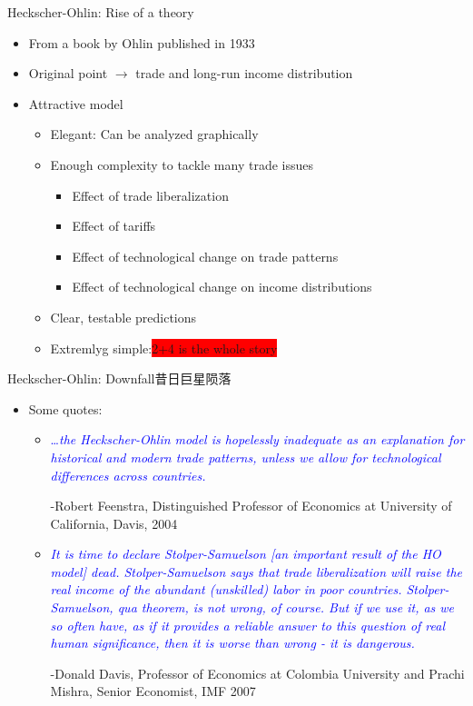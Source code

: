 \documentclass[10pt,hyperref={CJKbookmarks=true},xcolor=dvipsnames,aspectratio=169]{beamer}
\begin{document}
\begin{frame}{Heckscher-Ohlin: Rise of a theory}

\begin{itemize}
	\item From a book by Ohlin published in 1933 
	\item Original point $\rightarrow$ trade and long-run income distribution
	\item Attractive model
	\begin{itemize}
		\item Elegant: Can be analyzed graphically
		\item Enough complexity to tackle many trade issues
		\begin{itemize}
			\item Effect of trade liberalization
			\item Effect of tariffs
			\item Effect of technological change on trade patterns
			\item Effect of technological change on income distributions 
		\end{itemize}
		\item Clear, testable predictions
		\item Extremlyg simple:\colorbox{red}{\large{2+4} is the whole story}

	\end{itemize}
\end{itemize}

\end{frame}

\begin{frame}{Heckscher-Ohlin: Downfall昔日巨星陨落}

\begin{itemize}
\item Some quotes: 
\begin{itemize}
	\item \textcolor{blue}{\dots \emph{the Heckscher-Ohlin model is hopelessly inadequate as an explanation for historical and modern trade patterns, unless we allow for technological differences across countries.} }
	
	-Robert Feenstra, Distinguished Professor of Economics at University of California, Davis, 2004
	\item \textcolor{blue}{\emph{It is time to declare Stolper-Samuelson [an important result of the HO model] dead. Stolper-Samuelson says that trade liberalization will raise the real income of the abundant (unskilled) labor in poor countries.  Stolper-Samuelson, qua theorem, is not wrong, of course. But if we use it, as we so often have, as if it provides a reliable answer to this question of real human significance, then it is worse than wrong - it is dangerous.} }
	
	-Donald Davis, Professor of Economics at Colombia University and Prachi Mishra, Senior Economist, IMF 2007
\end{itemize}

\end{itemize}

\end{frame}
\end{document}

